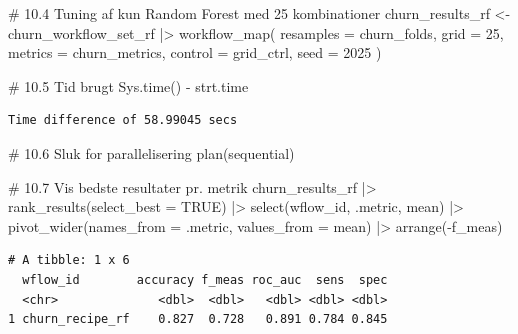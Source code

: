 \documentclass[
  11pt,
  letterpaper,
  DIV=11,
  numbers=noendperiod]{scrartcl}
\newenvironment{Shaded}{\begin{snugshade}}{\end{snugshade}}
\newcommand{\AttributeTok}[1]{\textcolor[rgb]{0.40,0.45,0.13}{#1}}
\newcommand{\CommentTok}[1]{\textcolor[rgb]{0.37,0.37,0.37}{#1}}
\newcommand{\ConstantTok}[1]{\textcolor[rgb]{0.56,0.35,0.01}{#1}}
\newcommand{\DecValTok}[1]{\textcolor[rgb]{0.68,0.00,0.00}{#1}}
\newcommand{\FunctionTok}[1]{\textcolor[rgb]{0.28,0.35,0.67}{#1}}
\newcommand{\NormalTok}[1]{\textcolor[rgb]{0.00,0.23,0.31}{#1}}
\newcommand{\OtherTok}[1]{\textcolor[rgb]{0.00,0.23,0.31}{#1}}
\newcommand{\SpecialCharTok}[1]{\textcolor[rgb]{0.37,0.37,0.37}{#1}}
\begin{document}
\begin{Shaded}
\begin{Highlighting}[]
\CommentTok{\# 10.4 Tuning af kun Random Forest med 25 kombinationer}
\NormalTok{churn\_results\_rf }\OtherTok{\textless{}{-}}\NormalTok{ churn\_workflow\_set\_rf }\SpecialCharTok{|\textgreater{}}
  \FunctionTok{workflow\_map}\NormalTok{(}
    \AttributeTok{resamples =}\NormalTok{ churn\_folds,}
    \AttributeTok{grid =} \DecValTok{25}\NormalTok{,}
    \AttributeTok{metrics =}\NormalTok{ churn\_metrics,}
    \AttributeTok{control =}\NormalTok{ grid\_ctrl,}
    \AttributeTok{seed =} \DecValTok{2025}
\NormalTok{  )}
\end{Highlighting}
\end{Shaded}

\begin{Shaded}
\begin{Highlighting}[]
\CommentTok{\# 10.5 Tid brugt}
\FunctionTok{Sys.time}\NormalTok{() }\SpecialCharTok{{-}}\NormalTok{ strt.time}
\end{Highlighting}
\end{Shaded}

\begin{verbatim}
Time difference of 58.99045 secs
\end{verbatim}

\begin{Shaded}
\begin{Highlighting}[]
\CommentTok{\# 10.6 Sluk for parallelisering}
\FunctionTok{plan}\NormalTok{(sequential)}

\CommentTok{\# 10.7 Vis bedste resultater pr. metrik}
\NormalTok{churn\_results\_rf }\SpecialCharTok{|\textgreater{}} 
  \FunctionTok{rank\_results}\NormalTok{(}\AttributeTok{select\_best =} \ConstantTok{TRUE}\NormalTok{) }\SpecialCharTok{|\textgreater{}} 
  \FunctionTok{select}\NormalTok{(wflow\_id, .metric, mean) }\SpecialCharTok{|\textgreater{}} 
  \FunctionTok{pivot\_wider}\NormalTok{(}\AttributeTok{names\_from =}\NormalTok{ .metric, }\AttributeTok{values\_from =}\NormalTok{ mean) }\SpecialCharTok{|\textgreater{}} 
  \FunctionTok{arrange}\NormalTok{(}\SpecialCharTok{{-}}\NormalTok{f\_meas)}
\end{Highlighting}
\end{Shaded}

\begin{verbatim}
# A tibble: 1 x 6
  wflow_id        accuracy f_meas roc_auc  sens  spec
  <chr>              <dbl>  <dbl>   <dbl> <dbl> <dbl>
1 churn_recipe_rf    0.827  0.728   0.891 0.784 0.845
\end{verbatim}
\end{document}
